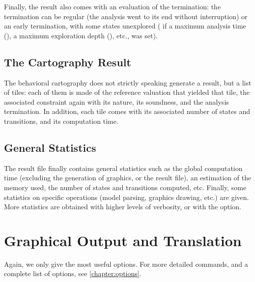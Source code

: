 Finally, the result also comes with an evaluation of the termination: the termination can be regular (the analysis went to its end without interruption) or an early termination, with some states unexplored (\eg{} if a maximum analysis time (), a maximum exploration depth (), etc., was set).


\section{The Cartography Result}

The behavioral cartography does not strictly speaking generate a result, but a list of tiles: each of them is made of the reference valuation that yielded that tile, the associated constraint again with its nature, its soundness, and the analysis termination.
In addition, each tile comes with its associated number of states and transitions, and its computation time.



\section{General Statistics}

The result file finally contains general statistics such as the global computation time (excluding the generation of graphics, or the result file), an estimation of the memory used, the number of states and transitions computed, etc.
Finally, some statistics on specific operations (model parsing, graphics drawing, etc.) are given.
More statistics are obtained with higher levels of verbosity, or with the  option.


\chapter{Graphical Output and Translation}


Again, we only give the most useful options.
For more detailed commands, and a complete list of options, see \cref{chapter:options}.

